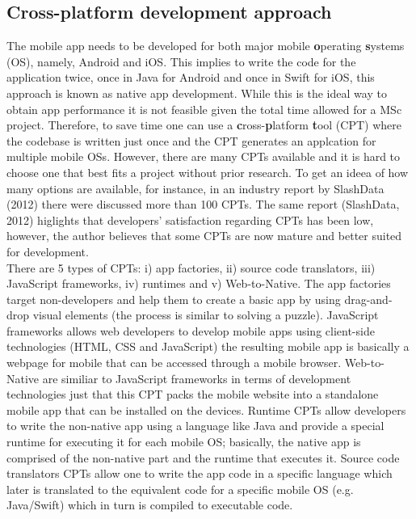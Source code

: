 \documentclass[version=last,fontsize=13pt]{scrartcl}
\begin{document}
	\subsection{Cross-platform development approach}
	The mobile app needs to be developed for both major mobile \textbf{o}perating \textbf{s}ystems (OS), namely, Android and iOS. This implies  to write the code for the application twice, once in Java  for Android and once in Swift for iOS, this approach is known as native app development. While this is the ideal way to obtain app performance it is not feasible given the total time allowed for a MSc project. Therefore, to save time one can use a \textbf{c}ross-\textbf{p}latform \textbf{t}ool (CPT) where the codebase is written just once and the CPT generates an applcation for multiple mobile OSs. However, there are many CPTs available and it is hard to choose one that best fits a project without prior research. To get an ideea of how many options are available, for instance, in an industry report by SlashData (2012) there were discussed more than 100 CPTs. The same report (SlashData, 2012) higlights that developers' satisfaction regarding CPTs has been low, however, the author believes that some CPTs are now mature and better suited for development. \\
	\indent
	There are 5 types of CPTs: i) app factories, ii) source code translators, iii) JavaScript frameworks, iv) runtimes and v) Web-to-Native. The app factories target non-developers and help them to create a basic app by using drag-and-drop visual elements (the process is similar to solving a puzzle). JavaScript frameworks allows web developers to develop mobile apps using client-side technologies (HTML, CSS and JavaScript) the resulting mobile app is basically a webpage for mobile that can be accessed through a mobile browser. Web-to-Native are similiar to JavaScript frameworks in terms of development technologies just that this CPT packs the mobile website into a standalone mobile app that can be installed on the devices. 
	Runtime CPTs allow developers to write the non-native app using a language like Java and provide a special runtime for executing it for each mobile OS; basically,  the native app is comprised of the non-native part and the runtime that executes it.  
	Source code translators CPTs allow one to write the app code in a specific language which later is translated to the equivalent code for a specific mobile OS (e.g. Java/Swift) which in turn is compiled to executable code.\\
\end{document}
